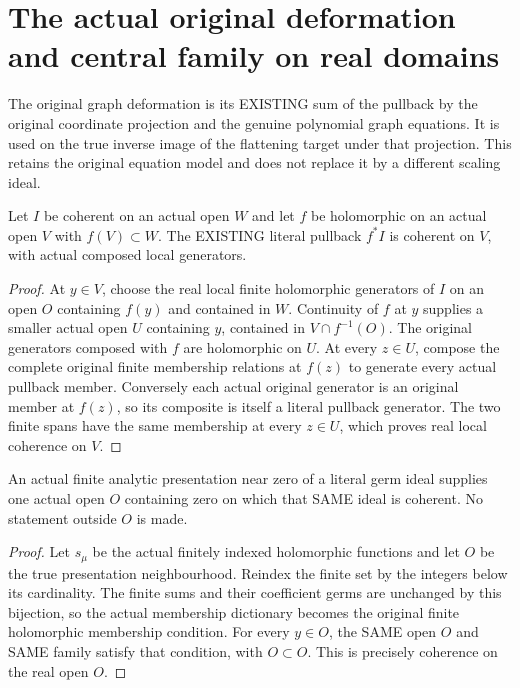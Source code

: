 \section{The actual original deformation and central family on real domains}

The original graph deformation is its EXISTING sum of the pullback by
the original coordinate projection and the genuine polynomial graph
equations. It is used on the true inverse image of the flattening
target under that projection. This retains the original equation model
and does not replace it by a different scaling ideal.

\begin{lemma}
\label{hir:real-domain-local-coherent-pullback}
\leanok
Let $I$ be coherent on an actual open $W$ and let $f$ be holomorphic on
an actual open $V$ with $f(V)\subset W$. The EXISTING literal pullback
$f^*I$ is coherent on $V$, with actual composed local generators.
\end{lemma}
\begin{proof}
At $y\in V$, choose the real local finite holomorphic generators of $I$
on an open $O$ containing $f(y)$ and contained in $W$. Continuity of $f$
at $y$ supplies a smaller actual open $U$ containing $y$, contained in
$V\cap f^{-1}(O)$. The original generators composed with $f$ are
holomorphic on $U$. At every $z\in U$, compose the complete original
finite membership relations at $f(z)$ to generate every actual
pullback member. Conversely each actual original generator is an
original member at $f(z)$, so its composite is itself a literal
pullback generator. The two finite spans have the same membership at
every $z\in U$, which proves real local coherence on $V$.
\end{proof}

\begin{lemma}
\label{hir:real-domain-finite-presentation-local-coherence}
\leanok
An actual finite analytic presentation near zero of a literal germ
ideal supplies one actual open $O$ containing zero on which that SAME
ideal is coherent. No statement outside $O$ is made.
\end{lemma}
\begin{proof}
Let $s_\mu$ be the actual finitely indexed holomorphic functions and
let $O$ be the true presentation neighbourhood. Reindex the finite
set by the integers below its cardinality. The finite sums and their
coefficient germs are unchanged by this bijection, so the actual
membership dictionary becomes the original finite holomorphic
membership condition. For every $y\in O$, the SAME open $O$ and SAME
family satisfy that condition, with $O\subset O$. This is precisely
coherence on the real open $O$.
\end{proof}

